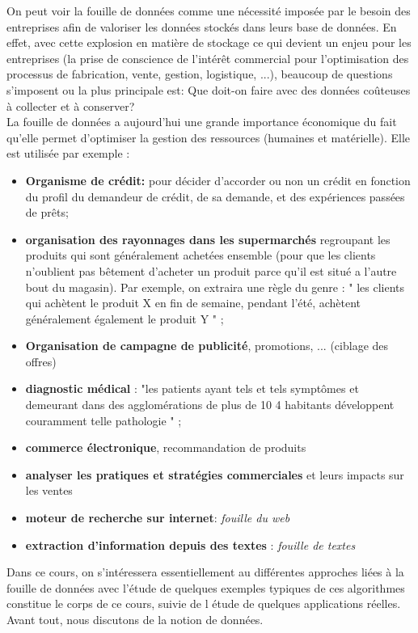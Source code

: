 \documentclass[runningheads,a4paper]{llncs}
\begin{document}
On peut voir la fouille de données comme une nécessité imposée par le besoin des 
entreprises afin de valoriser les données stockés dans leurs base de données. En effet, avec cette explosion en matière de stockage ce qui devient un enjeu pour les entreprises (la prise de conscience de l’intérêt commercial pour l’optimisation des processus de fabrication, vente, gestion, logistique, ...), beaucoup de questions s'imposent ou la plus principale est: Que doit-on faire avec des données coûteuses à collecter et à conserver?\\
La fouille de données a aujourd’hui une grande importance  économique du fait qu’elle permet d’optimiser la gestion des ressources (humaines et matérielle). Elle est utilisée par exemple :
\begin{itemize}
\item \textbf{Organisme de crédit:} pour décider d’accorder ou non un crédit en fonction du profil du demandeur de crédit, de sa demande, et des expériences passées de prêts;
\item \textbf{organisation des rayonnages dans les supermarchés} regroupant les produits qui sont généralement achetées ensemble (pour que les clients n’oublient pas bêtement d’acheter un produit parce qu'il est situé a l’autre bout du magasin). Par exemple, on extraira une règle du genre : " les clients qui achètent le produit X en fin de semaine, pendant l’été, achètent généralement également le produit Y " ;
\item \textbf{Organisation de campagne de publicité}, promotions, ... (ciblage des offres)
\item \textbf{diagnostic médical} : "les patients ayant tels et tels symptômes et demeurant dans des agglomérations de plus de 10 4 habitants développent couramment telle pathologie " ;
\item \textbf{commerce  électronique}, recommandation de produits
\item \textbf{analyser les pratiques et stratégies commerciales} et leurs impacts sur les ventes
\item \textbf{moteur de recherche sur internet}: \textit{fouille du web}
\item \textbf{extraction d’information depuis des textes} : \textit{fouille de textes}
\end{itemize}
Dans ce cours, on s’intéressera essentiellement au différentes approches liées à la fouille de données avec l’étude de quelques exemples typiques de ces algorithmes constitue le corps de ce cours, suivie de l étude de quelques applications réelles. Avant tout, nous discutons de la notion de données.
\end{document}
